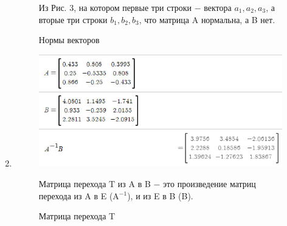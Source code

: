 \begin{enumerate}
\begin{figure}
            \caption{Нормы векторов}
            Из Рис. 3, на котором первые три строки $-$ вектора $a_1, a_2, a_3$, а вторые три строки $b_1, b_2, b_3$, что матрица A нормальна, а B нет.\\
        \end{figure}
    \item   
        \begin{figure}
            \centering
            \includegraphics[width=0.75\linewidth]{2_ABT.png}
            \caption{Матрица перехода T}
            Матрица перехода T из A в B $-$ это произведение матриц перехода из A в E (A$^{-1}$), и из E в B (B).
        \end{figure}
\end{enumerate}


\clearpage
